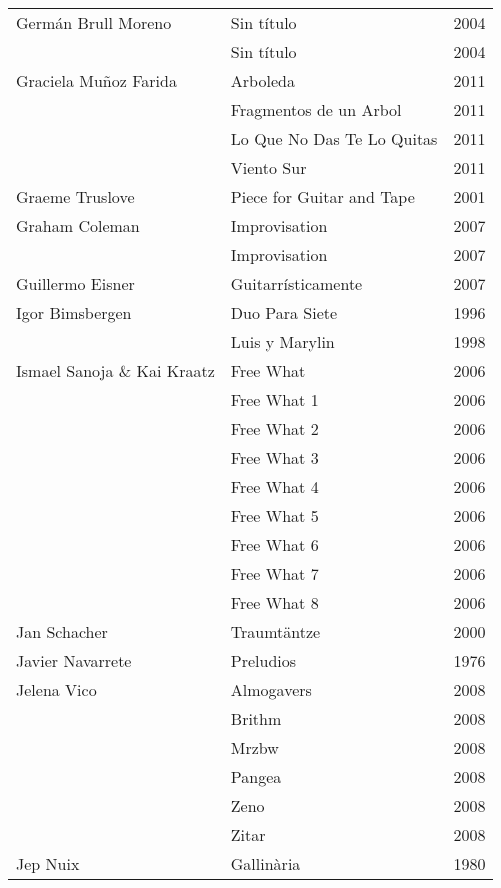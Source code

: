 \begin{center}
\begin{longtable}{ p{}  p{}  p{} }
Germán Brull Moreno & Sin título & 2004 \\ \cmidrule (r){2-3} 
& Sin título & 2004 \\ \midrule 
Graciela Muñoz Farida & Arboleda & 2011 \\ \cmidrule (r){2-3} 
& Fragmentos de un Arbol & 2011 \\ \cmidrule (r){2-3} 
& Lo Que No Das Te Lo Quitas & 2011 \\ \cmidrule (r){2-3} 
& Viento Sur & 2011 \\ \midrule 
Graeme Truslove & Piece for Guitar and Tape & 2001 \\ \midrule 
Graham Coleman & Improvisation & 2007 \\ \cmidrule (r){2-3} 
& Improvisation & 2007 \\ \midrule 
Guillermo Eisner & Guitarrísticamente & 2007 \\ \midrule 
Igor Bimsbergen & Duo Para Siete & 1996 \\ \midrule 
& Luis y Marylin & 1998 \\ \midrule 
Ismael Sanoja \& Kai Kraatz & Free What & 2006 \\ \cmidrule (r){2-3} 
& Free What 1 & 2006 \\ \cmidrule (r){2-3} 
& Free What 2 & 2006 \\ \cmidrule (r){2-3} 
& Free What 3 & 2006 \\ \cmidrule (r){2-3} 
& Free What 4 & 2006 \\ \cmidrule (r){2-3} 
& Free What 5 & 2006 \\ \cmidrule (r){2-3} 
& Free What 6 & 2006 \\ \cmidrule (r){2-3} 
& Free What 7 & 2006 \\ \cmidrule (r){2-3} 
& Free What 8 & 2006 \\ \midrule 
Jan Schacher & Traumtäntze & 2000 \\ \midrule 
Javier Navarrete & Preludios & 1976 \\ \midrule 
Jelena Vico & Almogavers & 2008 \\ \cmidrule (r){2-3} 
& Brithm & 2008 \\ \cmidrule (r){2-3} 
& Mrzbw & 2008 \\ \cmidrule (r){2-3} 
& Pangea & 2008 \\ \cmidrule (r){2-3} 
& Zeno & 2008 \\ \cmidrule (r){2-3} 
& Zitar & 2008 \\ \midrule 
Jep Nuix & Gallinària & 1980 \\ \cmidrule (r){2-3} 

\end{longtable}
\end{center}
